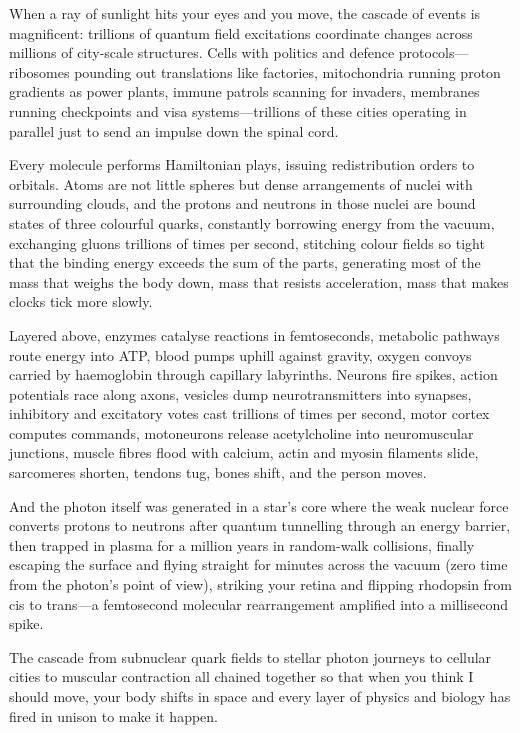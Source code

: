 When a ray of sunlight hits your eyes and you move, the cascade of events is magnificent: trillions of quantum field excitations coordinate changes across millions of city-scale structures. Cells with politics and defence protocols—ribosomes pounding out translations like factories, mitochondria running proton gradients as power plants, immune patrols scanning for invaders, membranes running checkpoints and visa systems—trillions of these cities operating in parallel just to send an impulse down the spinal cord.

Every molecule performs Hamiltonian plays, issuing redistribution orders to orbitals. Atoms are not little spheres but dense arrangements of nuclei with surrounding clouds, and the protons and neutrons in those nuclei are bound states of three colourful quarks, constantly borrowing energy from the vacuum, exchanging gluons trillions of times per second, stitching colour fields so tight that the binding energy exceeds the sum of the parts, generating most of the mass that weighs the body down, mass that resists acceleration, mass that makes clocks tick more slowly.

Layered above, enzymes catalyse reactions in femtoseconds, metabolic pathways route energy into ATP, blood pumps uphill against gravity, oxygen convoys carried by haemoglobin through capillary labyrinths. Neurons fire spikes, action potentials race along axons, vesicles dump neurotransmitters into synapses, inhibitory and excitatory votes cast trillions of times per second, motor cortex computes commands, motoneurons release acetylcholine into neuromuscular junctions, muscle fibres flood with calcium, actin and myosin filaments slide, sarcomeres shorten, tendons tug, bones shift, and the person moves.

And the photon itself was generated in a star's core where the weak nuclear force converts protons to neutrons after quantum tunnelling through an energy barrier, then trapped in plasma for a million years in random-walk collisions, finally escaping the surface and flying straight for minutes across the vacuum (zero time from the photon's point of view), striking your retina and flipping rhodopsin from cis to trans—a femtosecond molecular rearrangement amplified into a millisecond spike.

The cascade from subnuclear quark fields to stellar photon journeys to cellular cities to muscular contraction all chained together so that when you think \QSOpen{}I should move,\QSClose{} your body shifts in space and every layer of physics and biology has fired in unison to make it happen.

